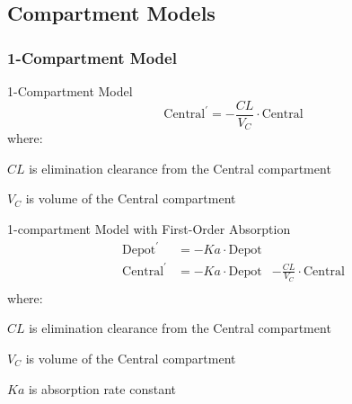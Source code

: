 \subsection{Compartment Models}
\subsubsection{1-Compartment Model}
\begin{frame}{1-Compartment Model}
    $$
        \text{Central}^{\prime} = -\frac{CL}{V_C} \cdot \text{Central}
    $$
    where:
    \begin{vfilleditems}
        \item $CL$ is elimination clearance from the Central compartment
        \item $V_C$ is volume of the Central compartment
    \end{vfilleditems}
\end{frame}

\begin{frame}{1-compartment Model with First-Order Absorption}
    $$
        \begin{aligned}
            \text{Depot}^{\prime}   & =        -Ka \cdot \text{Depot}                                        \\
            \text{Central}^{\prime} & = -Ka \cdot \text{Depot}        & -\frac{CL}{V_C} \cdot \text{Central} \\
        \end{aligned}
    $$
    where:
    \begin{vfilleditems}
        \item $CL$ is elimination clearance from the Central compartment
        \item $V_C$ is volume of the Central compartment
        \item $Ka$ is absorption rate constant
    \end{vfilleditems}

\end{frame}

